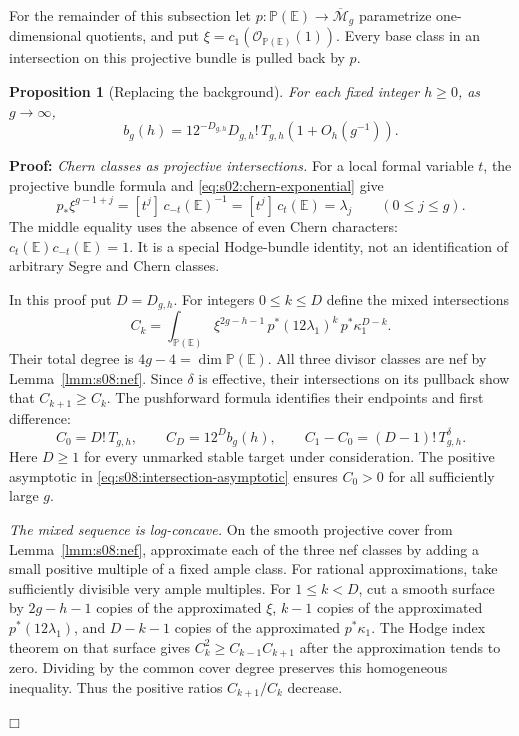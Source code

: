 \documentclass[a4paper,10pt]{article}
\numberwithin{equation}{section}
\newcommand{\MM}{\overline{\mathcal{M}}}
\newcommand{\EE}{\mathbb{E}}
\theoremstyle{paperplain}
\newtheorem{prp}[thm]{Proposition}
\theoremstyle{paperremark}
\theoremstyle{paperplain}
\newenvironment{prf}{\noindent \textbf{Proof: }}{\hfill $\mdlgwhtsquare$\par\addvspace{0.5\baselineskip}}
\begin{document}
For the remainder of this subsection let
$p:\mathbb P(\EE)\longrightarrow\MM_g$ parametrize one-dimensional
quotients, and put $\xi=c_1(\mathcal O_{\mathbb P(\EE)}(1))$.
Every base class in an intersection on this projective bundle is
pulled back by $p$.

\begin{prp}[Replacing the background]\label{prp:s08:background}
For each fixed integer $h\geq0$, as $g\to\infty$,
\begin{equation}\label{eq:s08:background}
 b_g(h)=12^{-D_{g,h}}D_{g,h}!\,T_{g,h}
                                      (1+O_h(g^{-1})).
\end{equation}
\end{prp}
\begin{prf}
\emph{Chern classes as projective intersections.}
For a local formal variable $t$, the projective bundle formula and
\eqref{eq:s02:chern-exponential} give
\begin{equation}\label{eq:s08:projective-pushforward}
 p_*\xi^{g-1+j}
 =[t^j]\,c_{-t}(\EE)^{-1}
 =[t^j]\,c_t(\EE)=\lambda_j
                                      \qquad(0\leq j\leq g).
\end{equation}
The middle equality uses the absence of even Chern characters:
$c_t(\EE)c_{-t}(\EE)=1$. It is a special Hodge-bundle identity,
not an identification of arbitrary Segre and Chern classes.

In this proof put $D=D_{g,h}$. For integers $0\leq k\leq D$ define
the mixed intersections
\begin{equation}\label{eq:s08:mixed-intersections}
 C_k=\int_{\mathbb P(\EE)}
       \xi^{2g-h-1}\,p^*(12\lambda_1)^k\,p^*\kappa_1^{D-k}.
\end{equation}
Their total degree is $4g-4=\dim\mathbb P(\EE)$. All three divisor
classes are nef by Lemma~\ref{lmm:s08:nef}. Since $\delta$ is
effective, their intersections on its pullback show that
$C_{k+1}\geq C_k$. The pushforward formula identifies their
endpoints and first difference:
\begin{equation}\label{eq:s08:mixed-endpoints}
 C_0=D!\,T_{g,h},\qquad
 C_D=12^D b_g(h),\qquad
 C_1-C_0=(D-1)!\,T_{g,h}^{\delta}.
\end{equation}
Here $D\geq1$ for every unmarked stable target under consideration.
The positive asymptotic in
\eqref{eq:s08:intersection-asymptotic} ensures $C_0>0$ for all
sufficiently large $g$.

\smallskip\noindent
\emph{The mixed sequence is log-concave.}
On the smooth projective cover from Lemma~\ref{lmm:s08:nef},
approximate each of the three nef classes by adding a small
positive multiple of a fixed ample class. For rational
approximations, take sufficiently divisible very ample multiples.
For $1\leq k<D$, cut a smooth surface by
$2g-h-1$ copies of the approximated $\xi$,
$k-1$ copies of the approximated $p^*(12\lambda_1)$, and
$D-k-1$ copies of the approximated $p^*\kappa_1$.
The Hodge index theorem on that surface gives
$C_k^2\geq C_{k-1}C_{k+1}$ after the approximation tends to zero.
Dividing by the common cover degree preserves this homogeneous
inequality. Thus the positive ratios $C_{k+1}/C_k$ decrease.


\end{prf}
\end{document}
